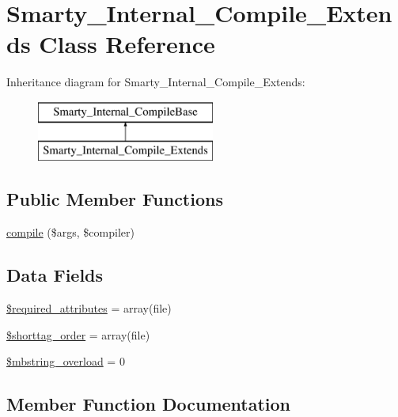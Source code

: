 \hypertarget{class_smarty___internal___compile___extends}{}\section{Smarty\+\_\+\+Internal\+\_\+\+Compile\+\_\+\+Extends Class Reference}
\label{class_smarty___internal___compile___extends}
Inheritance diagram for Smarty\+\_\+\+Internal\+\_\+\+Compile\+\_\+\+Extends\+:\begin{figure}[H]
\begin{center}
\leavevmode
\includegraphics[height=2.000000cm]{class_smarty___internal___compile___extends}
\end{center}
\end{figure}
\subsection*{Public Member Functions}
\begin{DoxyCompactItemize}
\item 
\hyperlink{class_smarty___internal___compile___extends_ad72fac0effa74aadee9b5ef6aed5f69f}{compile} (\$args, \$compiler)
\end{DoxyCompactItemize}
\subsection*{Data Fields}
\begin{DoxyCompactItemize}
\item 
\hyperlink{class_smarty___internal___compile___extends_ae799507d5461de485f3a618abeecea95}{\$required\+\_\+attributes} = array(\textquotesingle{}file\textquotesingle{})
\item 
\hyperlink{class_smarty___internal___compile___extends_a2ccb25269c3a92e8c4796c7ef23725e6}{\$shorttag\+\_\+order} = array(\textquotesingle{}file\textquotesingle{})
\item 
\hyperlink{class_smarty___internal___compile___extends_a2d2e9633d7a8387cb8072457e11839b5}{\$mbstring\+\_\+overload} = 0
\end{DoxyCompactItemize}


\subsection{Member Function Documentation}
\hypertarget{class_smarty___internal___compile___extends_ad72fac0effa74aadee9b5ef6aed5f69f}{}
